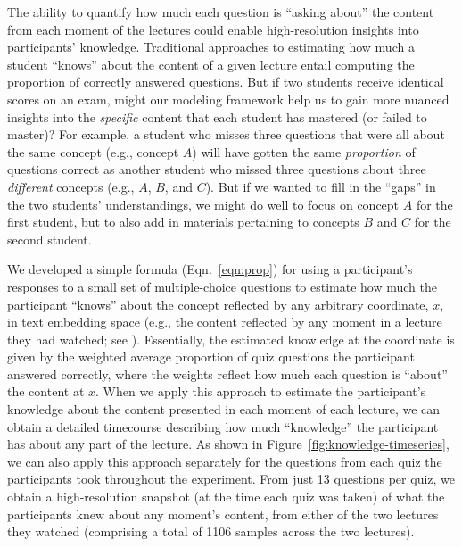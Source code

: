 \documentclass[10pt]{article}
\begin{document}
The ability to quantify how much each question is ``asking about'' the content
from each moment of the lectures could enable high-resolution insights into
participants' knowledge. Traditional approaches to estimating how much a
student ``knows'' about the content of a given lecture entail computing the
proportion of correctly answered questions. But if two students receive
identical scores on an exam, might our modeling framework help us to gain more
nuanced insights into the \textit{specific} content that each student has
mastered (or failed to master)? For example, a student who misses three
questions that were all about the same concept (e.g., concept $A$) will have
gotten the same \textit{proportion} of questions correct as another student who
missed three questions about three \textit{different} concepts (e.g., $A$, $B$,
and $C$). But if we wanted to fill in the ``gaps'' in the two students'
understandings, we might do well to focus on concept $A$ for the first student,
but to also add in materials pertaining to concepts $B$ and $C$ for the second
student.

We developed a simple formula (Eqn.~\ref{eqn:prop}) for using a participant's
responses to a small set of multiple-choice questions to estimate how much the
participant ``knows'' about the concept reflected by any arbitrary coordinate,
$x$, in text embedding space (e.g., the content reflected by any moment in a
lecture they had watched; see \textit{}).
Essentially, the estimated knowledge at the coordinate is given by the weighted
average proportion of quiz questions the participant answered correctly, where
the weights reflect how much each question is ``about'' the content at $x$.
When we apply this approach to estimate the participant's knowledge about the
content presented in each moment of each lecture, we can obtain a detailed
timecourse describing how much ``knowledge'' the participant has about any part
of the lecture. As shown in Figure~\ref{fig:knowledge-timeseries}, we can also
apply this approach separately for the questions from each quiz the
participants took throughout the experiment. From just 13 questions per quiz,
we obtain a high-resolution snapshot (at the time each quiz was taken) of what
the participants knew about any moment's content, from either of the two
lectures they watched (comprising a total of 1106 samples across the two
lectures).
\end{document}
